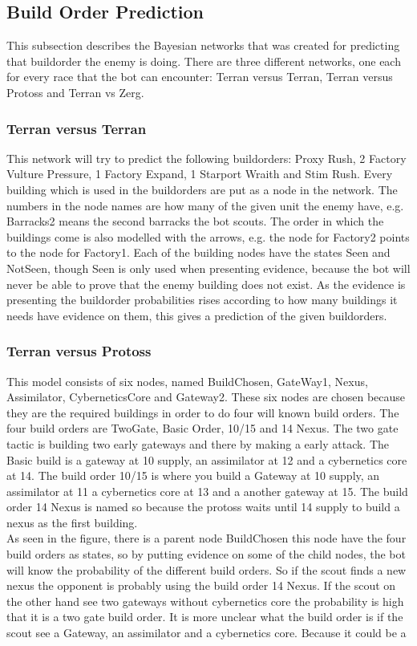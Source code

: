 \subsection{Build Order Prediction}
This subsection describes the Bayesian networks that was created for predicting that buildorder the enemy is doing. There are three different networks, one each for every race that the bot can encounter: Terran versus Terran, Terran versus Protoss and Terran vs Zerg.

\subsubsection{Terran versus Terran}
	This network will try to predict the following buildorders: Proxy Rush, 2 Factory Vulture Pressure, 1 Factory Expand, 1 Starport Wraith and Stim Rush. 
	Every building which is used in the buildorders are put as a node in the network. The numbers in the node names are how many of the given unit the 
	enemy have, e.g. Barracks2 means the second barracks the bot scouts. The order in which the buildings come is also modelled with the arrows, 
	e.g. the node for Factory2 points to the node for Factory1. Each of the building nodes have the states Seen and NotSeen, though Seen is only used when 
	presenting evidence, because the bot will never be able to prove that the enemy building does not exist. As the evidence is presenting the buildorder 
	probabilities rises according to how many buildings it needs have evidence on them, this gives a prediction of the given buildorders.
	
\subsubsection{Terran versus Protoss}
This model consists of six nodes, named BuildChosen, GateWay1, Nexus, Assimilator, CyberneticsCore and Gateway2. These six nodes are chosen  because they are the required buildings in order to do four will known build orders. The four build orders are TwoGate, Basic Order, 10/15 and 14 Nexus.
The two gate tactic is building two early gateways and there by making a early attack. The Basic build is a gateway at 10 supply, an assimilator at 12 and a cybernetics core at 14. The build order 10/15 is where you build a Gateway at 10 supply, an assimilator at 11 a cybernetics core at 13  and a 
another gateway at 15. The build order 14 Nexus is named so because the protoss waits until 14 supply to build a nexus as the first building. \\
As seen in the figure, there is a parent node BuildChosen this node have the four build orders as states, so by putting evidence on some of the child nodes, the bot will know the probability of the different build orders. So if the scout finds a new nexus the opponent is probably using the build order
14 Nexus. If the scout on the other hand see two gateways without cybernetics core the probability is high that it is a two gate build order. It is more unclear what the build order is if the scout see a Gateway, an assimilator and a cybernetics core. Because it could be a  

